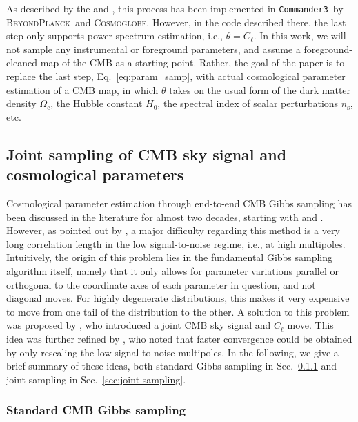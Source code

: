 \documentclass[twocolumn]{aa}
\def\commanderthree{\texttt{Commander3}}
\newcommand{\BP}{\textsc{BeyondPlanck}}
\newcommand{\Cosmoglobe}{\textsc{Cosmoglobe}}
\begin{document}
As described by the \citet{bp01} and \citet{watts2023_dr1}, this process has been implemented in \commanderthree\ by \BP\ and \Cosmoglobe. However, in the code described there, the last step only supports power spectrum estimation, i.e., $\theta = C_{\ell}$. In this work, we will not sample any instrumental or foreground parameters, and assume a foreground-cleaned map of the CMB as a starting point. Rather, the goal of the paper is to replace the last step, Eq.~\eqref{eq:param_samp}, with actual cosmological parameter estimation of a CMB map, in which $\theta$ takes on the usual form of the dark matter density $\Omega_\mathrm{c}$, the Hubble constant $H_0$, the spectral index of scalar perturbations $n_\mathrm{s}$, etc.

\subsection{Joint sampling of CMB sky signal and cosmological parameters}

Cosmological parameter estimation through end-to-end CMB Gibbs sampling has been discussed in the literature for almost two decades, starting with \citet{jewell2004} and \citet{wandelt2004}. However, as pointed out by \citet{eriksen:2004}, a major difficulty regarding this method is a very long correlation length in the low signal-to-noise regime, i.e., at high multipoles. Intuitively, the origin of this problem lies in the fundamental Gibbs sampling algorithm itself, namely that it only allows for parameter variations parallel or orthogonal to the coordinate axes of each parameter in question, and not diagonal moves. For highly degenerate distributions, this makes it very expensive to move from one tail of the distribution to the other. A solution to this problem was proposed by \citet{jewell:2009}, who introduced a joint CMB sky signal and $C_\ell$ move. This idea was further refined by \citet{racine:2016}, who noted that faster convergence could be obtained by only rescaling the low signal-to-noise multipoles. In the following, we give a brief summary of these ideas, both standard Gibbs sampling in Sec.~\ref{sec:gibbs} and joint sampling in Sec.~\ref{sec:joint-sampling}.

\subsubsection{Standard CMB Gibbs sampling}
\label{sec:gibbs}
\end{document}
